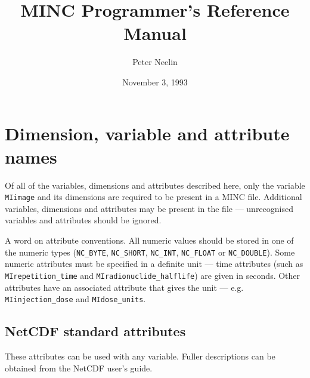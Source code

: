 \documentclass{article}
\title{MINC Programmer's Reference Manual}
\author{Peter Neelin}
\date{November 3, 1993}
\begin{document}
\def\code#1{{\tt #1}}

\maketitle

\tableofcontents

\clearpage

\section{Dimension, variable and attribute names}

Of all of the variables, dimensions and attributes described here, only
the variable \code{MIimage} and its dimensions are required to be
present in a MINC file. Additional variables, dimensions and
attributes may be present in the file --- unrecognised variables and
attributes should be ignored.

A word on attribute conventions. All numeric values should be stored
in one of the numeric types (\code{NC\_BYTE}, \code{NC\_SHORT},
\code{NC\_INT}, \code{NC\_FLOAT} or \code{NC\_DOUBLE}). Some numeric
attributes must be specified in a definite unit --- time attributes
(such as \code{MIrepetition\_time} and \code{MIradionuclide\_halflife}) 
are given in seconds. Other attributes have an associated attribute that
gives the unit --- e.g. \code{MIinjection\_dose} and \code{MIdose\_units}.

\subsection{NetCDF standard attributes}

These attributes can be used with any variable. Fuller descriptions
can be obtained from the NetCDF user's guide.
\end{document}
